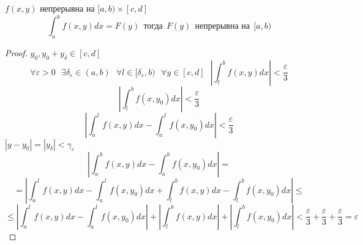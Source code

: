 \begin{theorem}
  $f(x,y)$ непрерывна на $[a,b) \times [c, d]$
  $$
  \int_a^b f(x,y) dx = F(y) ~~ \text{тогда} ~~ F(y) ~~ \text{непрерывна на} ~~
  [a,b)
  $$
\end{theorem}

\begin{proof}
  $y_0, y_0 + y_{\delta} \in [c, d]$
  $$
  \forall \varepsilon > 0
  ~~~
  \exists \delta_{\varepsilon} \in (a,b)
  ~~~
  \forall l \in [\delta_{\varepsilon}, b)
  ~~~
  \forall y \in [c, d]
  ~~~
  \left|
    \int_l^b f(x,y)dx
  \right|
  < \frac{\varepsilon}{3}
  $$
  $$
  \left|
    \int_l^b f(x,y_0)dx
  \right|
  < \frac{\varepsilon}{3}
  $$
  $$
  \left|
    \int_a^l f(x,y)dx
    -
    \int_a^l f(x,y_0)dx
  \right|
  < \frac{\varepsilon}{3}
  $$
  $|y - y_0| = |y_{\delta}| < \gamma_{\varepsilon}$
  $$
  \left|
    \int_a^b f(x,y)dx
    -
    \int_a^b f(x,y_0)dx
  \right|
  =
  $$
  $$
  =
  \left|
    \int_a^l f(x,y)dx
    -
    \int_a^l f(x,y_0)dx
    +
    \int_l^b f(x,y)dx
    -
    \int_l^b f(x,y_0)dx
  \right|
  \le
  $$
  $$
  \le
  \left|
    \int_a^l f(x,y)dx
    -
    \int_a^l f(x,y_0)dx
  \right|
  +
  \left|
    \int_l^b f(x,y)dx
  \right|
  +
  \left|
    \int_l^b f(x,y_0)dx
  \right|
  <
    \frac{\varepsilon}{3}
    +
    \frac{\varepsilon}{3}
    +
    \frac{\varepsilon}{3}
  =
    \varepsilon
  $$
\end{proof}
